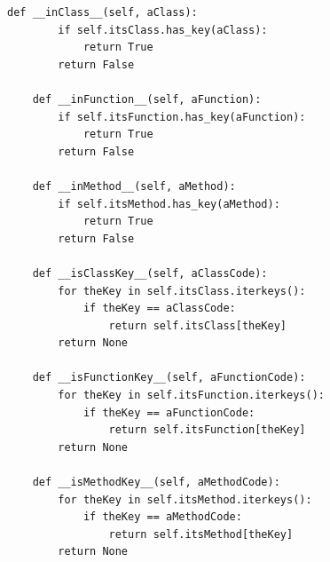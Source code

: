 \documentclass[12pt,legalpaper]{report}
\begin{document}
\begin{singlespace}
\begin{lstlisting}[style=Python]
    def __inClass__(self, aClass):
        if self.itsClass.has_key(aClass):
            return True
        return False

    def __inFunction__(self, aFunction):
        if self.itsFunction.has_key(aFunction):
            return True
        return False

    def __inMethod__(self, aMethod):
        if self.itsMethod.has_key(aMethod):
            return True
        return False

    def __isClassKey__(self, aClassCode):
        for theKey in self.itsClass.iterkeys():
            if theKey == aClassCode:
                return self.itsClass[theKey]
        return None

    def __isFunctionKey__(self, aFunctionCode):
        for theKey in self.itsFunction.iterkeys():
            if theKey == aFunctionCode:
                return self.itsFunction[theKey]
        return None

    def __isMethodKey__(self, aMethodCode):
        for theKey in self.itsMethod.iterkeys():
            if theKey == aMethodCode:
                return self.itsMethod[theKey]
        return None


\end{lstlisting}
\end{singlespace}
\end{document}
